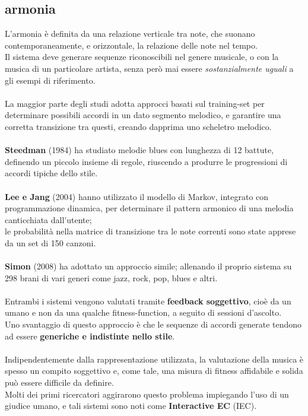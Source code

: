 \documentclass[a4paper,12pt]{report}
\begin{document}
\subsection{armonia}

L'armonia è definita da una relazione verticale tra note, che suonano contemporaneamente, e orizzontale, la relazione delle note nel tempo. \\
Il sistema deve generare sequenze riconoscibili nel genere musicale, o con la musica di un particolare artista, senza però mai essere \textit{sostanzialmente uguali} a gli esempi di riferimento. \\
\\
La maggior parte degli studi adotta approcci basati sul training-set per determinare possibili accordi in un dato segmento melodico, e garantire una corretta transizione tra questi, creando dapprima uno scheletro melodico. \\
\\
\textbf{Steedman} (1984) ha studiato melodie blues con lunghezza di 12 battute, definendo un piccolo insieme di regole, riuscendo a produrre le progressioni di accordi tipiche dello stile. \\
\\
\textbf{Lee e Jang} (2004) hanno utilizzato il modello di Markov, integrato con programmazione dinamica, per determinare il pattern armonico di una melodia canticchiata dall'utente; \\
le probabilità nella matrice di transizione tra le note correnti sono state apprese da un set di 150 canzoni. \\
\\
\textbf{Simon} (2008) ha adottato un approccio simile; allenando il proprio sistema su 298 brani di vari generi come jazz, rock, pop, blues e altri. \\
\\
Entrambi i sistemi vengono valutati tramite \textbf{feedback soggettivo}, cioè da un umano e non da una qualche fitness-function, a seguito di sessioni d'ascolto. \\
Uno svantaggio di questo approccio è che le sequenze di accordi generate tendono ad essere \textbf{generiche e indistinte nello stile}. \\
\\
Indipendentemente dalla rappresentazione utilizzata, la valutazione della musica è spesso un compito soggettivo e, come tale, una misura di fitness affidabile e solida può essere difficile da definire. \\
Molti dei primi ricercatori aggirarono questo problema impiegando l'uso di un giudice umano, e tali sistemi sono noti come \textbf{Interactive EC} (IEC). \\
\end{document}
